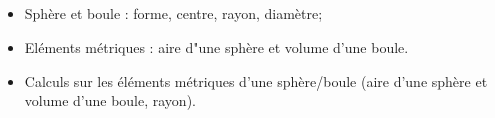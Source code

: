 \newpage

\subsection*{}

\savoir
\begin{itemize}
\item Sphère et boule : forme, centre, rayon, diamètre;
\item Eléments métriques : aire d"une sphère et volume d'une boule.
\end{itemize}
\savoirfaire
\begin{itemize}
\item Calculs sur les éléments métriques d'une sphère/boule (aire d'une sphère et volume d'une boule, rayon).
\end{itemize}